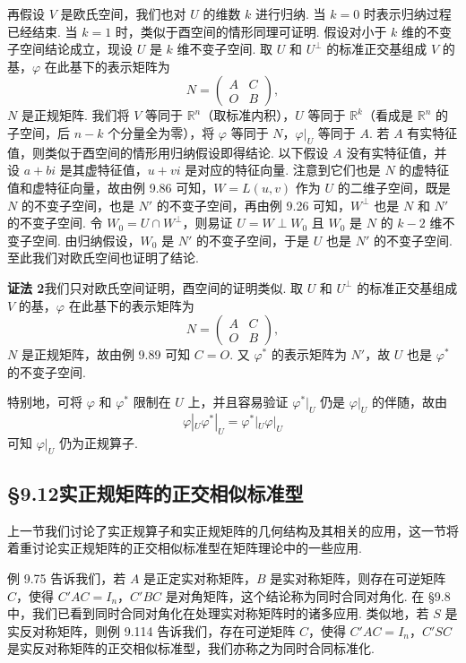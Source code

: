 \documentclass[UTF8, 12pt, fontset=fandol, oneside]{ctexart}
\begin{document}
再假设 $V$ 是欧氏空间，我们也对 $U$ 的维数 $k$ 进行归纳. 当 $k=0$ 时表示归纳过程已经结束. 当 $k=1$ 时，类似于酉空间的情形同理可证明. 假设对小于 $k$ 维的不变子空间结论成立，现设 $U$ 是 $k$ 维不变子空间. 取 $U$ 和 $U^\perp$ 的标准正交基组成 $V$ 的基，$\varphi$ 在此基下的表示矩阵为
\[
N=\begin{pmatrix}
A&C\\
O&B
\end{pmatrix},
\]
$N$ 是正规矩阵. 我们将 $V$ 等同于 $\mathbb{R}^n$（取标准内积），$U$ 等同于 $\mathbb{R}^k$（看成是 $\mathbb{R}^n$ 的子空间，后 $n-k$ 个分量全为零），将 $\varphi$ 等同于 $N$，$\varphi|_U$ 等同于 $A$. 若 $A$ 有实特征值，则类似于酉空间的情形用归纳假设即得结论. 以下假设 $A$ 没有实特征值，并设 $a+bi$ 是其虚特征值，$u+vi$ 是对应的特征向量. 注意到它们也是 $N$ 的虚特征值和虚特征向量，故由例 9.86 可知，$W=L(u,v)$ 作为 $U$ 的二维子空间，既是 $N$ 的不变子空间，也是 $N'$ 的不变子空间，再由例 9.26 可知，$W^\perp$ 也是 $N$ 和 $N'$ 的不变子空间. 令 $W_0=U\cap W^\perp$，则易证 $U=W\perp W_0$ 且 $W_0$ 是 $N$ 的 $k-2$ 维不变子空间. 由归纳假设，$W_0$ 是 $N'$ 的不变子空间，于是 $U$ 也是 $N'$ 的不变子空间. 至此我们对欧氏空间也证明了结论.

\noindent\textbf{证法 2}\quad 我们只对欧氏空间证明，酉空间的证明类似. 取 $U$ 和 $U^\perp$ 的标准正交基组成 $V$ 的基，$\varphi$ 在此基下的表示矩阵为
\[
N=\begin{pmatrix}
A&C\\
O&B
\end{pmatrix},
\]
$N$ 是正规矩阵，故由例 9.89 可知 $C=O$. 又 $\varphi^*$ 的表示矩阵为 $N'$，故 $U$ 也是 $\varphi^*$ 的不变子空间.

特别地，可将 $\varphi$ 和 $\varphi^*$ 限制在 $U$ 上，并且容易验证 $\varphi^*|_U$ 仍是 $\varphi|_U$ 的伴随，故由
\[
\varphi|_U\varphi^*|_U=\varphi^*|_U\varphi|_U
\]
可知 $\varphi|_U$ 仍为正规算子.

\subsection*{§9.12\quad 实正规矩阵的正交相似标准型}

上一节我们讨论了实正规算子和实正规矩阵的几何结构及其相关的应用，这一节将着重讨论实正规矩阵的正交相似标准型在矩阵理论中的一些应用.

例 9.75 告诉我们，若 $A$ 是正定实对称矩阵，$B$ 是实对称矩阵，则存在可逆矩阵 $C$，使得 $C'AC=I_n$，$C'BC$ 是对角矩阵，这个结论称为同时合同对角化. 在 §9.8 中，我们已看到同时合同对角化在处理实对称矩阵时的诸多应用. 类似地，若 $S$ 是实反对称矩阵，则例 9.114 告诉我们，存在可逆矩阵 $C$，使得 $C'AC=I_n$，$C'SC$ 是实反对称矩阵的正交相似标准型，我们亦称之为同时合同标准化.
\end{document}
